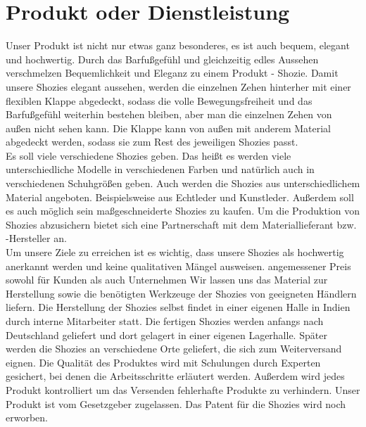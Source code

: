 \chapter{Produkt oder Dienstleistung}
\label{cha:3}
Unser Produkt ist nicht nur etwas ganz besonderes, es ist auch bequem, elegant und hochwertig.
Durch das Barfußgefühl und gleichzeitig edles Aussehen verschmelzen Bequemlichkeit und Eleganz zu einem Produkt - Shozie.
Damit unsere Shozies elegant aussehen, werden die einzelnen Zehen hinterher mit einer flexiblen Klappe abgedeckt, sodass die volle Bewegungsfreiheit und das Barfußgefühl weiterhin bestehen bleiben, aber man die einzelnen Zehen von außen nicht sehen kann.
Die Klappe kann von außen mit anderem Material abgedeckt werden, sodass sie zum Rest des jeweiligen Shozies passt.\\
Es soll viele verschiedene Shozies geben. Das heißt es werden viele unterschiedliche Modelle in verschiedenen Farben und natürlich auch in verschiedenen Schuhgrößen geben. Auch werden die Shozies aus unterschiedlichem Material angeboten. Beispielsweise aus Echtleder und Kunstleder. Außerdem soll es auch möglich sein maßgeschneiderte Shozies zu kaufen.
Um die Produktion von Shozies abzusichern bietet sich eine Partnerschaft mit dem Materiallieferant bzw. -Hersteller an.\\
Um unsere Ziele zu erreichen ist es wichtig, dass unsere Shozies als hochwertig anerkannt werden und keine qualitativen Mängel ausweisen.
angemessener Preis sowohl für Kunden als auch Unternehmen
Wir lassen uns das Material zur Herstellung sowie die benötigten Werkzeuge der Shozies von geeigneten Händlern liefern.
Die Herstellung der Shozies selbst findet in einer eigenen Halle in Indien durch interne Mitarbeiter statt.
Die fertigen Shozies werden anfangs nach Deutschland geliefert und dort gelagert in einer eigenen Lagerhalle. Später werden die Shozies an verschiedene Orte geliefert, die sich zum Weiterversand eignen.
Die Qualität des Produktes wird mit Schulungen durch Experten gesichert, bei denen die Arbeitsschritte erläutert werden. Außerdem wird jedes Produkt kontrolliert um das Versenden fehlerhafte Produkte zu verhindern.
Unser Produkt ist vom Gesetzgeber zugelassen. Das Patent für die Shozies wird noch erworben.
